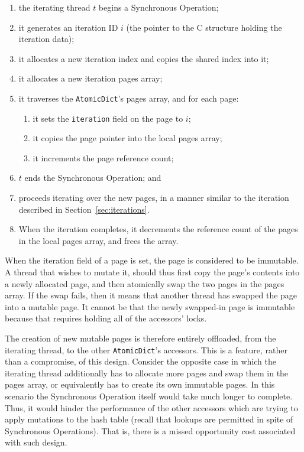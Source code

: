 \begin{enumerate}
    \item the iterating thread $t$ begins a Synchronous Operation;
    \item it generates an iteration ID $i$ (the pointer to the C structure holding the iteration data);
    \item it allocates a new iteration index and copies the shared index into it;
    \item it allocates a new iteration pages array;
    \item it traverses the \texttt{AtomicDict}'s pages array, and for each page:
    \begin{enumerate}
        \item it sets the \texttt{iteration} field on the page to $i$;
        \item it copies the page pointer into the local pages array;
        \item it increments the page reference count;
    \end{enumerate}
    \item $t$ ends the Synchronous Operation; and
    \item proceeds iterating over the new pages, in a manner similar to the iteration described in Section~\ref{sec:iterations}.
    \item When the iteration completes, it decrements the reference count of the pages in the local pages array, and frees the array.
\end{enumerate}

When the iteration field of a page is set, the page is considered to be immutable.
A thread that wishes to mutate it, should thus first copy the page's contents into a newly allocated page, and then atomically swap the two pages in the pages array.
If the swap fails, then it means that another thread has swapped the page into a mutable page.
It cannot be that the newly swapped-in page is immutable because that requires holding all of the accessors' locks.

The creation of new mutable pages is therefore entirely offloaded, from the iterating thread, to the other \texttt{AtomicDict}'s accessors.
This is a feature, rather than a compromise, of this design.
Consider the opposite case in which the iterating thread additionally has to allocate more pages and swap them in the pages array, or equivalently has to create its own immutable pages.
In this scenario the Synchronous Operation itself would take much longer to complete.
Thus, it would hinder the performance of the other accessors which are trying to apply mutations to the hash table (recall that lookups are permitted in spite of Synchronous Operations).
That is, there is a missed opportunity cost associated with such design.

